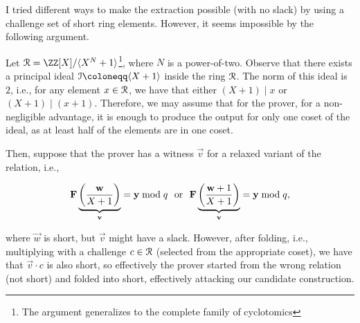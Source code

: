 I tried different ways to make the extraction possible (with no slack) by using a challenge set of short ring elements. However, it seems impossible by the following argument. 

Let $\ring = \ZZ[X] / \langle X^N + 1 \rangle$\footnote{The argument generalizes to the complete family of cyclotomics}, where $N$ is a power-of-two. Observe that there exists a principal ideal $\mathcal{I} \defeq \langle X + 1 \rangle$ inside the ring $\mathcal{R}$. The norm of this ideal is $2$, i.e., for any element $x \in \mathcal{R}$, we have that either $(X + 1) \mid x$ or $(X + 1) \mid (x+1)$. Therefore, we may assume that for the prover, for a non-negligible advantage, it is enough to produce the output for only one coset of the ideal, as at least half of the elements are in one coset.

Then, suppose that the prover has a witness $\vec{v}$ for a relaxed variant of the relation, i.e., 

\[ \mathbf{F} \underbrace{\left( \frac{{{\mathbf{w}}}}{X + 1} \right)}_{{{\mathbf{v}}}}  = {{\mathbf{y}}} \bmod q ~~\text{or}~~ \mathbf{F} \underbrace{\left( \frac{{{\mathbf{w}}} + 1}{X + 1} \right)}_{{{\mathbf{v}}}} = {{\mathbf{y}}} \bmod q, \]

where $\vec{w}$ is short, but $\vec{v}$ might have a slack. However, after folding, i.e., multiplying with a challenge $c \in \mathcal{R}$ (selected from the appropriate coset), we have that $\vec{v} \cdot c$ is also short, so effectively the prover started from the wrong relation (not short) and folded into short, effectively attacking our candidate construction. 
